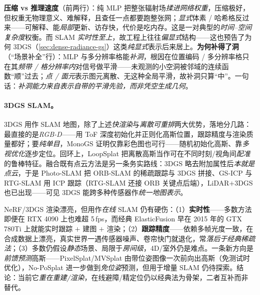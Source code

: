 \begin{insight}
\textbf{压缩 vs 推理速度}（前两行）：纯 MLP 把整张辐射场\emph{揉进网络权重}，压缩极好，但权重无物理意义、难解释，且查任一点都要跑整张网；\emph{显式}体素 / 哈希格反过来——可解释、能\emph{局部}更新、访存快，代价是吃内存。这是一对典型的\emph{时间--空间复杂度}权衡。而 SLAM \emph{实时性至上}，故工程上往往\emph{偏显式}结构——这也预告了为何 3DGS（\cref{sec:dense-radiance-gs}）这类\emph{纯显式}表示后来居上。\textbf{为何补得了洞}（“场景补全”行）：MLP 与多分辨率格能\emph{补洞}，根因在位置编码 / 多分辨率格只在其\emph{频带 / 格分辨率内}对信号做平滑——未观测的小空洞被邻域的连续函数“顺”过去；\emph{点 / 面元}表示图元离散、无这种全局平滑，故补洞只算“中”。一句话：\emph{补洞能力来自表示自带的平滑先验，而非凭空生成几何}。
\end{insight}

\paragraph{3DGS SLAM。}
3DGS 用作 SLAM 地图，除了上述\emph{快渲染}与\emph{离散可重排}两大优势，落地分几路：最直接的是\emph{RGB-D}——用 ToF 深度初始化并正则化高斯位置，跟踪精度与渲染质量都好；要\emph{纯单目}，MonoGS\cite{matsuki2024monogs} 证明仅靠彩色图也可行——随机初始化高斯、靠\emph{多视优化}逐步定位。回环上，LoopSplat\cite{zhu2024loopsplat} 把离散高斯当作可在不同时刻/视角间\emph{配准}的鲁棒特征。融合既有点云方法是另一条务实路线：3DGS 略去附加属性后\emph{本就是点云}，于是 Photo-SLAM 把 ORB-SLAM 的稀疏跟踪与 3DGS 拼接、GS-ICP 与 RTG-SLAM 用 ICP 跟踪（RTG-SLAM 还接 ORB 关键点后端），LiDAR$+$3DGS 也已出现——可见 3DGS 能跨多种传感器作\emph{统一地图表示}。

\begin{pitfall}
NeRF/3DGS 渲染漂亮，但用作\emph{在线} SLAM 仍有硬伤\cite{matsuki2024monogs}：（1）\textbf{实时性}——多数方法即便在 RTX 4090 上也难超 5\,fps，而经典 ElasticFusion 早在 2015 年的 GTX 780Ti 上就能实时跟踪 $+$ 建图 $+$ 渲染；（2）\textbf{跟踪精度}——依赖多帧光度一致，在合成数据上漂亮，真实世界一遇传感器噪声、卷帘快门就退化，常\emph{落后于经典稀疏法}；（3）多数仍假设\emph{静态}场景、局限于\emph{房间级}，4D/室外仍是难点。一条新方向是\emph{前馈预测}高斯——PixelSplat/MVSplat 由带位姿图像一次前向出高斯（免测试时优化），No-PoSplat\cite{charatan2024pixelsplat} 进一步做到\emph{免位姿}预测，但用于增量 SLAM 仍待探索。结论：当前它\emph{重在重建/渲染}，在线避障/精定位仍以经典法为骨架，二者互补而非替代。
\end{pitfall}

